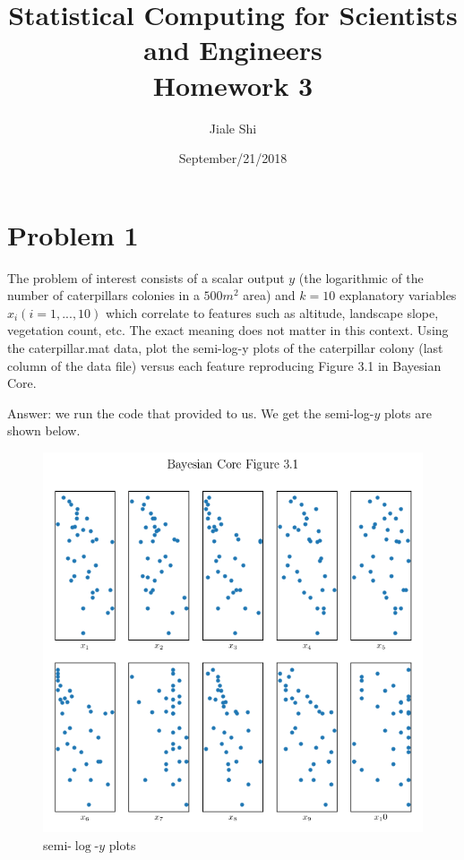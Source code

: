 \documentclass{article}
\title{Statistical Computing for Scientists and Engineers\\[1em] Homework 3}
\author{Jiale Shi}
\date{September/21/2018}
\begin{document}
\maketitle

\newpage
\section{Problem 1}
The problem of interest consists of a scalar output $y$ (the logarithmic of the number of caterpillars colonies in a $500 m^2$ area) and $k=10$ explanatory variables $x_{i} (i=1,...,10)$ which correlate to features such as altitude, landscape slope, vegetation count, etc. The exact meaning does not matter in this context. Using the caterpillar.mat data, plot the semi-log-y plots of the caterpillar colony (last column of the data file) versus each feature reproducing Figure 3.1 in Bayesian Core.

Answer: we run the code that provided to us. We get the semi-log-$y$ plots are shown below.

\begin{figure}[h!]
\centering
\includegraphics[scale=0.6]{Figure3_1.png}
\caption{semi-$\log$-$y$ plots}
\end{figure}




\newpage
\end{document}
